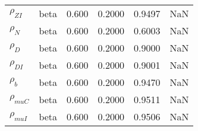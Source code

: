 \begin{center}
\begin{longtable}{llcccc}
${\rho_{ZI}}$ & beta &   0.600 & 0.2000 &   0.9497 &     NaN \\ 
${\rho_N}$ & beta &   0.600 & 0.2000 &   0.6003 &     NaN \\ 
${\rho_D}$ & beta &   0.600 & 0.2000 &   0.9000 &     NaN \\ 
${\rho_{DI}}$ & beta &   0.600 & 0.2000 &   0.9001 &     NaN \\ 
${\rho_b}$ & beta &   0.600 & 0.2000 &   0.9470 &     NaN \\ 
${\rho_{muC}}$ & beta &   0.600 & 0.2000 &   0.9511 &     NaN \\ 
${\rho_{muI}}$ & beta &   0.600 & 0.2000 &   0.9506 &     NaN \\ 
\end{longtable}
 \end{center}
